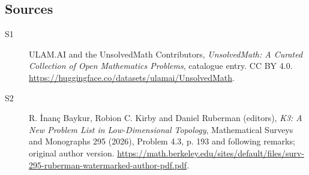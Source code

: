 \documentclass[11pt]{article}
\begin{document}
\subsection{Sources}
\begin{description}
\item[\hypertarget{source:statement:1}{S1}] ULAM.AI and the UnsolvedMath Contributors, \emph{UnsolvedMath: A Curated Collection of Open Mathematics Problems}, catalogue entry. CC BY 4.0. \url{https://huggingface.co/datasets/ulamai/UnsolvedMath}.
\item[\hypertarget{source:statement:2}{S2}] R. İnanç Baykur, Robion C. Kirby and Daniel Ruberman (editors), \emph{K3: A New Problem List in Low-Dimensional Topology}, Mathematical Surveys and Monographs 295 (2026), Problem 4.3, p. 193 and following remarks; original author version. \url{https://math.berkeley.edu/sites/default/files/surv-295-ruberman-watermarked-author-pdf.pdf}.
\end{description}
\label{end:statement}
\end{document}
